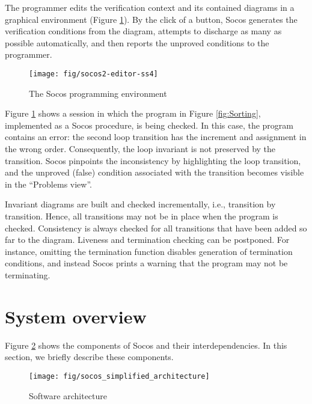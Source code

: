 \documentclass[english,submission]{eptcs}
\begin{document}
The programmer edits the verification context and its contained diagrams
in a graphical environment (Figure \ref{fig:SelectionSort}). By the
click of a button, Socos generates the verification conditions from
the diagram, attempts to discharge as many as possible automatically,
and then reports the unproved conditions to the programmer. 
\begin{figure}[h]
\begin{centering}
\texttt{[image: fig/socos2-editor-ss4]}
\par\end{centering}

\caption{The Socos programming environment\label{fig:SelectionSort}}
\end{figure}
Figure \ref{fig:SelectionSort} shows a session in which the
program in Figure \ref{fig:Sorting}, implemented as a Socos procedure,
is being checked. In this case, the program contains an error: the
second loop transition has the increment  and assignment
 in the wrong order. Consequently, the loop invariant
is not preserved by the transition. Socos pinpoints the inconsistency
by highlighting the loop transition, and the unproved (false) condition
associated with the transition becomes visible in the {}``Problems
view''. 

Invariant diagrams are built and checked incrementally, i.e., transition
by transition. Hence, all transitions may not be in place when the
program is checked. Consistency is always checked for all transitions
that have been added so far to the diagram. Liveness and termination
checking can be postponed. For instance, omitting the termination
function disables generation of termination conditions, and instead
Socos prints a warning that the program may not be terminating.


\section{System overview\label{sec:System-overview}}

Figure \ref{fig:Architecture} shows the components of Socos and their
interdependencies. In this section, we briefly describe these components.

\begin{figure}[h]
\begin{centering}
\texttt{[image: fig/socos\_simplified\_architecture]}
\par\end{centering}

\caption{Software architecture\label{fig:Architecture}}
\end{figure}
\end{document}
